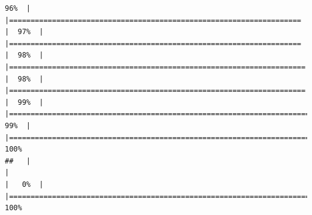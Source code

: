 \documentclass[
  english,
  man,a4paper,mask,floatsintext]{apa6}
\begin{document}
\begin{verbatim}
96%  |                                                                              |====================================================================  |  97%  |                                                                              |====================================================================  |  98%  |                                                                              |===================================================================== |  98%  |                                                                              |===================================================================== |  99%  |                                                                              |======================================================================|  99%  |                                                                              |======================================================================| 100%
##   |                                                                              |                                                                      |   0%  |                                                                              |======================================================================| 100%

\end{verbatim}
\end{document}
